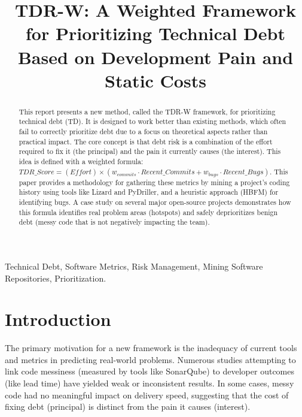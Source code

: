 \documentclass[conference]{IEEEtran}
\begin{document}
\title{TDR-W: A Weighted Framework for Prioritizing Technical Debt Based on Development Pain and Static Costs}

\author{
\and
{}
}

\maketitle

\begin{abstract}
This report presents a new method, called the TDR-W framework, for prioritizing technical debt (TD). It is designed to work better than existing methods, which often fail to correctly prioritize debt due to a focus on theoretical aspects rather than practical impact. The core concept is that debt risk is a combination of the effort required to fix it (the principal) and the pain it currently causes (the interest). 
This idea is defined with a weighted formula:
$TDR\_Score = (Effort) \times (w_{commits} \cdot Recent\_Commits + w_{bugs} \cdot Recent\_Bugs)$.
This paper provides a methodology for gathering these metrics by mining a project's coding history using tools like Lizard and PyDriller, and a heuristic approach (HBFM) for identifying bugs. A case study on several major open-source projects demonstrates how this formula identifies real problem areas (hotspots) and safely deprioritizes benign debt (messy code that is not negatively impacting the team).
\end{abstract}

\begin{IEEEkeywords}
Technical Debt, Software Metrics, Risk Management, Mining Software Repositories, Prioritization.
\end{IEEEkeywords}

\section{Introduction}
The primary motivation for a new framework is the inadequacy of current tools and metrics in predicting real-world problems. Numerous studies attempting to link code messiness (measured by tools like SonarQube) to developer outcomes (like lead time) have yielded weak or inconsistent results. In some cases, messy code had no meaningful impact on delivery speed, suggesting that the cost of fixing debt (principal) is distinct from the pain it causes (interest).
\end{document}
